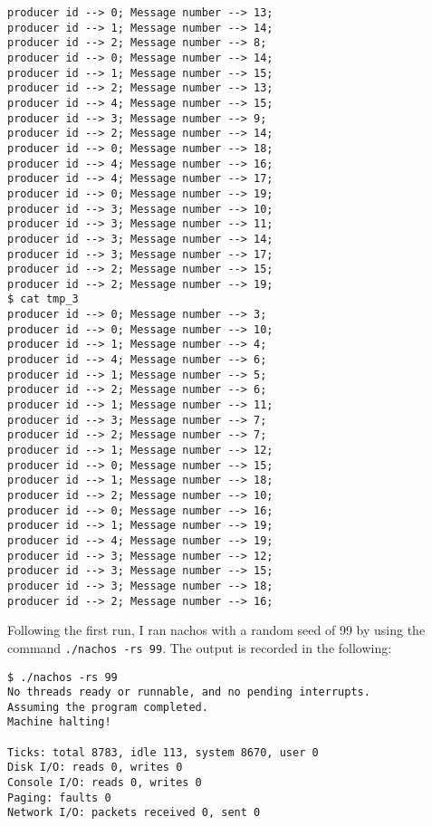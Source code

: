 \documentclass[11pt]{article}
\begin{document}
\begin{question}
\begin{subquestion}
\begin{verbatim}
producer id --> 0; Message number --> 13;
producer id --> 1; Message number --> 14;
producer id --> 2; Message number --> 8;
producer id --> 0; Message number --> 14;
producer id --> 1; Message number --> 15;
producer id --> 2; Message number --> 13;
producer id --> 4; Message number --> 15;
producer id --> 3; Message number --> 9;
producer id --> 2; Message number --> 14;
producer id --> 0; Message number --> 18;
producer id --> 4; Message number --> 16;
producer id --> 4; Message number --> 17;
producer id --> 0; Message number --> 19;
producer id --> 3; Message number --> 10;
producer id --> 3; Message number --> 11;
producer id --> 3; Message number --> 14;
producer id --> 3; Message number --> 17;
producer id --> 2; Message number --> 15;
producer id --> 2; Message number --> 19;
$ cat tmp_3
producer id --> 0; Message number --> 3;
producer id --> 0; Message number --> 10;
producer id --> 1; Message number --> 4;
producer id --> 4; Message number --> 6;
producer id --> 1; Message number --> 5;
producer id --> 2; Message number --> 6;
producer id --> 1; Message number --> 11;
producer id --> 3; Message number --> 7;
producer id --> 2; Message number --> 7;
producer id --> 1; Message number --> 12;
producer id --> 0; Message number --> 15;
producer id --> 1; Message number --> 18;
producer id --> 2; Message number --> 10;
producer id --> 0; Message number --> 16;
producer id --> 1; Message number --> 19;
producer id --> 4; Message number --> 19;
producer id --> 3; Message number --> 12;
producer id --> 3; Message number --> 15;
producer id --> 3; Message number --> 18;
producer id --> 2; Message number --> 16;
        \end{verbatim}

        Following the first run, I ran nachos with a random seed of 99 by using the command {\tt ./nachos -rs 99}. The output is recorded in the following:

        \begin{verbatim}
$ ./nachos -rs 99
No threads ready or runnable, and no pending interrupts.
Assuming the program completed.
Machine halting!

Ticks: total 8783, idle 113, system 8670, user 0
Disk I/O: reads 0, writes 0
Console I/O: reads 0, writes 0
Paging: faults 0
Network I/O: packets received 0, sent 0


\end{verbatim}
\end{subquestion}
\end{question}
\end{document}
